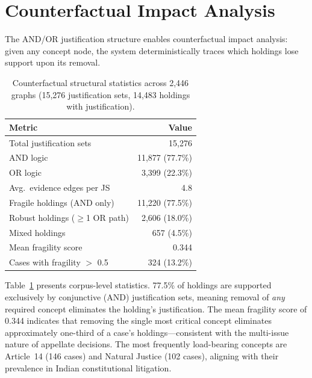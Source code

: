 \documentclass[11pt]{article}
\begin{document}
\section{Counterfactual Impact Analysis}
\label{sec:counterfactual}

The AND/OR justification structure enables counterfactual impact analysis: given any concept node, the system deterministically traces which holdings lose support upon its removal.

\begin{table}[t]
\small
\centering
\caption{Counterfactual structural statistics across 2,446 graphs (15,276 justification sets, 14,483 holdings with justification).}
\label{tab:counterfactual}
\begin{tabular}{lr}
\toprule
Metric & Value \\
\midrule
Total justification sets & 15,276 \\
AND logic & 11,877 (77.7\%) \\
OR logic & 3,399 (22.3\%) \\
Avg.\ evidence edges per JS & 4.8 \\
\midrule
Fragile holdings (AND only) & 11,220 (77.5\%) \\
Robust holdings ($\geq$1 OR path) & 2,606 (18.0\%) \\
Mixed holdings & 657 (4.5\%) \\
\midrule
Mean fragility score & 0.344 \\
Cases with fragility $>$ 0.5 & 324 (13.2\%) \\
\bottomrule
\end{tabular}
\end{table}

Table~\ref{tab:counterfactual} presents corpus-level statistics. 77.5\% of holdings are supported exclusively by conjunctive (AND) justification sets, meaning removal of \emph{any} required concept eliminates the holding's justification. The mean fragility score of 0.344 indicates that removing the single most critical concept eliminates approximately one-third of a case's holdings---consistent with the multi-issue nature of appellate decisions. The most frequently load-bearing concepts are Article~14 (146 cases) and Natural Justice (102 cases), aligning with their prevalence in Indian constitutional litigation.
\end{document}
